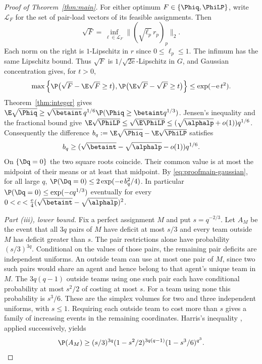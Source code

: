 \begin{proof}[Proof of Theorem~\ref{thm:main}]
For either optimum $F\in\{\Phiq,\PhiLP\}$, write $\mathcal L_F$ for the set of
pair-load vectors of its feasible assignments. Then
\[
\sqrt F=\inf_{\ell\in\mathcal L_F}
  \bigl\lVert(\sqrt{\ell_p}\,r_p)_p\bigr\rVert_2 .
\]
Each norm on the right is $1$-Lipschitz in $r$ since $0\le\ell_p\le 1$.
The infimum has the same Lipschitz bound. Thus $\sqrt F$ is
$1/\sqrt{2\mathrm e}$-Lipschitz in $G$, and Gaussian concentration
\cite[\S5.4]{BLM13} gives, for $t>0$,
\begin{equation}\label{eq:proofmain-gaussian}
\max\left\{\P\bigl(\sqrt F-\E\sqrt F\ge t\bigr),
            \P\bigl(\E\sqrt F-\sqrt F\ge t\bigr)\right\}
\le \exp(-\mathrm e\,t^2).
\end{equation}
Theorem~\ref{thm:integer} gives
$\E\sqrt{\Phiq}\ge\sqrt{\betaint}\,q^{1/6}\P(\Phiq\ge\betaint q^{1/3})$.
Jensen's inequality and the fractional bound give
$\E\sqrt{\PhiLP}\le\sqrt{\E\PhiLP}\le(\sqrt{\alphalp}+o(1))q^{1/6}$.
Consequently the difference $b_q:=\E\sqrt{\Phiq}-\E\sqrt{\PhiLP}$ satisfies
\[
b_q\ge (\sqrt{\betaint}-\sqrt{\alphalp}-o(1))q^{1/6}.
\]
On $\{\Dq=0\}$ the two square roots coincide. Their common value is
at most the midpoint of their means or at least that midpoint. By
\eqref{eq:proofmain-gaussian}, for all large $q$,
$\P(\Dq=0)\le 2\exp(-\mathrm e\,b_q^2/4)$.
In particular $\P(\Dq=0)\le \exp(-c q^{1/3})$ eventually for every
$0<c<\tfrac{\mathrm e}{4}(\sqrt{\betaint}-\sqrt{\alphalp})^2$.

\emph{Part \textup{(iii)}, lower bound.} Fix a perfect assignment $M$ and put
$s=q^{-2/3}$. Let $A_M$ be the event that all $3q$ pairs of $M$ have deficit
at most $s/3$ and every team outside $M$ has deficit greater than $s$.
The pair restrictions alone have probability $(s/3)^{3q}$. Conditional on
the values of those pairs, the remaining pair deficits are independent uniforms.
An outside team can use at most one pair of $M$, since two such pairs would share
an agent and hence belong to that agent's unique team in $M$. The $3q(q-1)$ outside
teams using one such pair each have conditional probability at most $s^2/2$ of
costing at most $s$. For a team using none this probability is $s^3/6$.
These are the simplex volumes for two and three independent uniforms, with
$s\le1$. Requiring each outside team to cost more than $s$ gives a family of
increasing events in the remaining coordinates. Harris's inequality
\cite{Harris60}, applied successively, yields
\[
\P(A_M)\ge (s/3)^{3q}
  (1-s^2/2)^{3q(q-1)}(1-s^3/6)^{q^3}.
\]


\end{proof}
